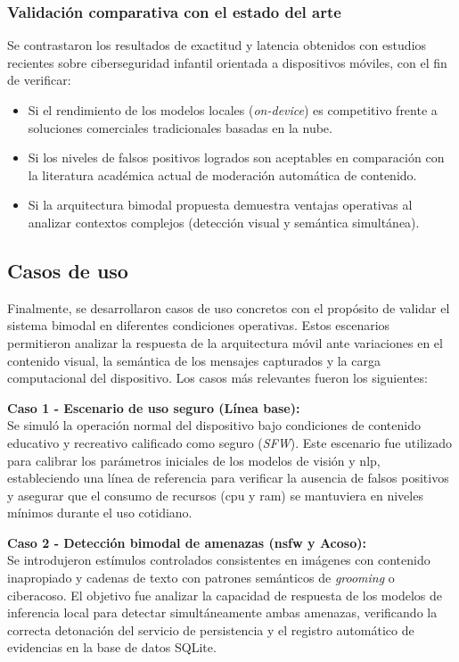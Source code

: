 \subsubsection{Validación comparativa con el estado del arte}
Se contrastaron los resultados de exactitud y latencia obtenidos con estudios recientes sobre ciberseguridad infantil orientada a dispositivos móviles, con el fin de verificar:
\begin{itemize}
    \item Si el rendimiento de los modelos locales (\textit{on-device}) es competitivo frente a soluciones comerciales tradicionales basadas en la nube.
    \item Si los niveles de falsos positivos logrados son aceptables en comparación con la literatura académica actual de moderación automática de contenido.
    \item Si la arquitectura bimodal propuesta demuestra ventajas operativas al analizar contextos complejos (detección visual y semántica simultánea).
\end{itemize}

\subsection{Casos de uso}
Finalmente, se desarrollaron casos de uso concretos con el propósito de validar el sistema bimodal en diferentes condiciones operativas. Estos escenarios permitieron analizar la respuesta de la arquitectura móvil ante variaciones en el contenido visual, la semántica de los mensajes capturados y la carga computacional del dispositivo. Los casos más relevantes fueron los siguientes:

\textbf{Caso 1 - Escenario de uso seguro (Línea base):} \\
Se simuló la operación normal del dispositivo bajo condiciones de contenido educativo y recreativo calificado como seguro (\textit{SFW}). Este escenario fue utilizado para calibrar los parámetros iniciales de los modelos de visión y \gls{nlp}, estableciendo una línea de referencia para verificar la ausencia de falsos positivos y asegurar que el consumo de recursos (\gls{cpu} y \gls{ram}) se mantuviera en niveles mínimos durante el uso cotidiano.

\textbf{Caso 2 - Detección bimodal de amenazas (\gls{nsfw} y Acoso):} \\
Se introdujeron estímulos controlados consistentes en imágenes con contenido inapropiado y cadenas de texto con patrones semánticos de \textit{grooming} o ciberacoso. El objetivo fue analizar la capacidad de respuesta de los modelos de inferencia local para detectar simultáneamente ambas amenazas, verificando la correcta detonación del servicio de persistencia y el registro automático de evidencias en la base de datos SQLite.

